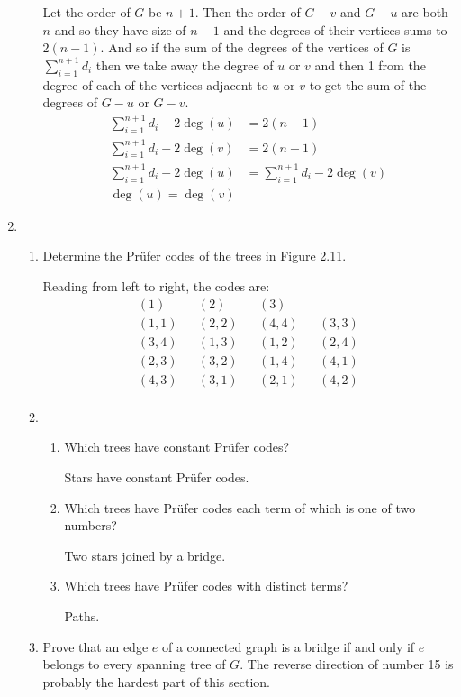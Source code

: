 \documentclass[letterpaper]{article}
\begin{document}
\begin{enumerate}
\begin{enumerate}
  Let the order of $G$ be $n+1$. Then the order of $G-v$ and $G-u$ are both $n$ and so they have size of $n-1$ and the degrees of their vertices sums to $2(n-1)$. And so if the sum of the degrees of the vertices of $G$ is $\sum\limits_{i=1}^{n+1}{d_i}$ then we take away the degree of $u$ or $v$ and then 1 from the degree of each of the vertices adjacent to $u$ or $v$ to get the sum of the degrees of $G-u$ or $G-v$.
  \begin{align*}
    \sum\limits_{i=1}^{n+1}{d_i}-2\deg(u)&=2(n-1)\\
    \sum\limits_{i=1}^{n+1}{d_i}-2\deg(v)&=2(n-1)\\
    \sum\limits_{i=1}^{n+1}{d_i}-2\deg(u)&=\sum\limits_{i=1}^{n+1}{d_i}-2\deg(v)\\
    \deg(u)=\deg(v)
  \end{align*}
  \end{enumerate}
\item
\begin{enumerate}
  \item
  Determine the Prüfer codes of the trees in Figure 2.11.

  Reading from left to right, the codes are:
  \begin{align*}
    (1)&&(2)&&(3)\\
    (1,1)&&(2,2)&&(4,4)&&(3,3)\\
    (3,4)&&(1,3)&&(1,2)&&(2,4)\\
    (2,3)&&(3,2)&&(1,4)&&(4,1)\\
    (4,3)&&(3,1)&&(2,1)&&(4,2)\\
  \end{align*}
  \item
  \begin{enumerate}
    \item
    Which trees have constant Prüfer codes?

    Stars have constant Prüfer codes.
    \item
    Which trees have Prüfer codes each term of which is one of two numbers?

    Two stars joined by a bridge.
    \item
    Which trees have Prüfer codes with distinct terms?

    Paths.
  \end{enumerate}
  \setcounter{enumii}{14}
  \item
  Prove that an edge $e$ of a connected graph is a bridge if and only if $e$ belongs to every spanning tree of $G$.
  The reverse direction of number 15 is probably the hardest part of this section.


\end{enumerate}
\end{enumerate}
\end{document}
